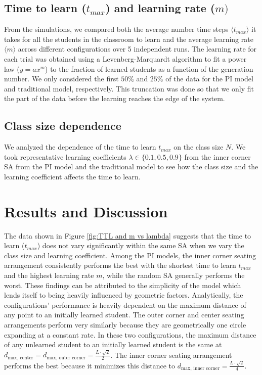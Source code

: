 \documentclass[10pt,a4paper,twoside]{article}
\begin{document}
\subsection{Time to learn ($t_{max}$) and learning rate ($m)$}
From the simulations, we compared both the average number time steps $\langle t_{max} \rangle$ it takes for all the students in the classroom to learn and the average learning rate $\langle m \rangle$ across different configurations over 5 independent runs. The learning rate for each trial was obtained using a Levenberg-Marquardt algorithm to fit a power law ($y = ax^m$) to the fraction of learned students as a function of the generation number. We only considered the first $50\%$ and $25\%$ of the data for the PI model and traditional model, respectively. This truncation was done so that we only fit the part of the data before the learning reaches the edge of the system. 

\subsection{Class size dependence}
We analyzed the dependence of the time to learn $t_{max}$ on the class size $N$. We took representative learning coefficients $\lambda \in \lbrace 0.1, 0.5, 0.9 \rbrace$ from the inner corner SA from the PI model and the traditional model to see how the class size and the learning coefficient affects the time to learn. %

\section{Results and Discussion}
The data shown in Figure \ref{fig:TTL and m vs lambda} suggests that the time to learn ($t_{max}$) does not vary significantly within the same SA when we vary the class size and learning coefficient. Among the PI models, the inner corner seating arrangement consistently performs the best with the shortest time to learn $t_{max}$ and the highest learning rate $m$, while the random SA generally performs the worst. These findings can be attributed to the simplicity of the model which lends itself to being heavily influenced by geometric factors. Analytically, the configurations’ performance is heavily dependent on the maximum distance of any point to an initially learned student. The outer corner and center seating arrangements perform very similarly because they are geometrically one circle expanding at a constant rate. In these two configurations, the maximum distance of any unlearned student to an initially learned student is the same at $d_{\text{max, center}} = d_{\text{max, outer corner}}=\frac{L\cdot\sqrt{2}}{2}$. The inner corner seating arrangement performs the best because it minimizes this distance to $d_{\text{max, inner corner}}=\frac{L\cdot\sqrt{2}}{4}$.
\end{document}
